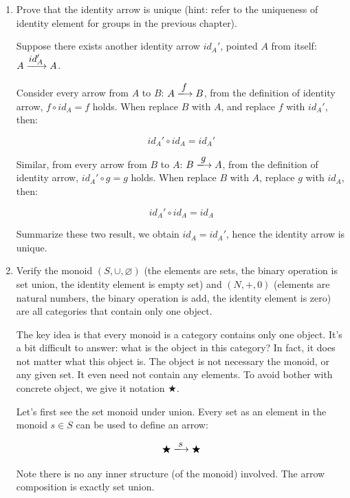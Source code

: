 \documentclass[UTF8]{article}
\begin{document}
\begin{enumerate}
\item {Prove that the identity arrow is unique (hint: refer to the uniqueness of identity element for groups in the previous chapter).}

Suppose there exists another identity arrow $id_A'$, pointed $A$ from itself: $A \arrowto{id_A'} A$.

Consider every arrow from $A$ to $B$: $A \arrowto{f} B$, from the definition of identity arrow, $f \circ id_A = f$ holds. When replace $B$ with $A$, and replace $f$ with $id_A'$, then:

\[
id_A' \circ id_A = id_A'
\]

Similar, from every arrow from $B$ to $A$: $B \arrowto{g} A$, from the definition of identity arrow, $id_A' \circ g = g$ holds. When replace $B$ with $A$, replace $g$ with $id_A$, then:

\[
id_A' \circ id_A = id_A
\]

Summarize these two result, we obtain $id_A = id_A'$, hence the identity arrow is unique.

\item {Verify the monoid $(S, \cup, \varnothing)$ (the elements are sets, the binary operation is set union, the identity element is empty set) and $(N, +, 0)$ (elements are natural numbers, the binary operation is add, the identity element is zero) are all categories that contain only one object.}

The key idea is that every monoid is a category contains only one object. It's a bit difficult to answer: what is the object in this category? In fact, it does not matter what this object is. The object is not necessary the monoid, or any given set. It even need not contain any elements. To avoid bother with concrete object, we give it notation $\bigstar$.

Let's first see the set monoid under union. Every set as an element in the monoid $s \in S$ can be used to define an arrow:

\[
\bigstar \arrowto{s} \bigstar
\]

Note there is no any inner structure (of the monoid) involved. The arrow composition is exactly set union.

\begin{center}
\end{center}


\end{enumerate}
\end{document}
